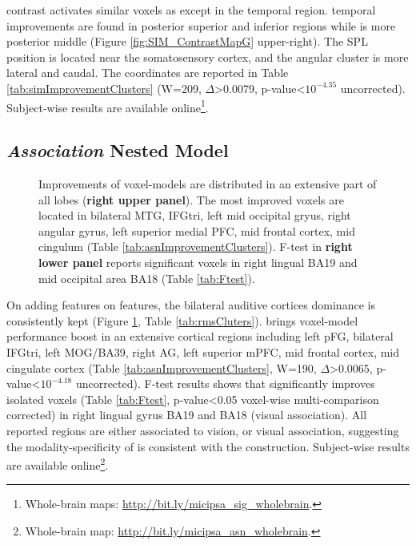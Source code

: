  contrast activates similar voxels as  except in the temporal region.  temporal improvements are found in posterior superior and inferior regions while  is more posterior middle (Figure \ref{fig:SIM_ContrastMapG} upper-right). The SPL position is located near the somatosensory cortex, and the angular cluster is more lateral and caudal. The coordinates are reported in Table \ref{tab:simImprovementClusters} (W=209, \(\Delta\)>0.0079, p-value<\(10^{-4.35}\) uncorrected).  Subject-wise results are available online\footnote{Whole-brain maps: \url{http://bit.ly/micipsa_sig_wholebrain}.}.

\subsection{\emph{Association} Nested Model}

\begin{figure}
    \centering
    \caption[Encoding with  Features, Group]{Improvements of voxel-models are distributed in an extensive part of all lobes (\textbf{right upper panel}). The most improved voxels are located in bilateral MTG, IFGtri, left mid occipital gryus, right angular gyrus, left superior medial PFC, mid frontal cortex, mid cingulum (Table \ref{tab:asnImprovementClusters}). F-test in \textbf{right lower panel} reports significant voxels in right lingual BA19 and mid occipital area BA18 (Table \ref{tab:Ftest}).} 
    \label{fig:ASN_ContrastMapG}
\end{figure}

On adding  features on  features, the bilateral auditive cortices dominance is consistently kept (Figure \ref{fig:ASN_ContrastMapG}, Table \ref{tab:rmsCluters}).  brings voxel-model performance boost in an extensive cortical regions including left pFG, bilateral IFGtri, left MOG/BA39, right AG, left superior mPFC, mid frontal cortex, mid cingulate cortex (Table \ref{tab:asnImprovementClusters}, W=190, \(\Delta\)>0.0065, p-value<\(10^{-4.18}\) uncorrected). F-test results shows that  significantly improves isolated voxels (Table \ref{tab:Ftest}, p-value<0.05 voxel-wise multi-comparison corrected) in right lingual gyrus BA19 and BA18 (visual association). All reported regions are either associated to vision, or visual association, suggesting the modality-specificity of \association is consistent with the  construction.
Subject-wise results are available online\footnote{Whole-brain map: \url{http://bit.ly/micipsa_asn_wholebrain}.}.

